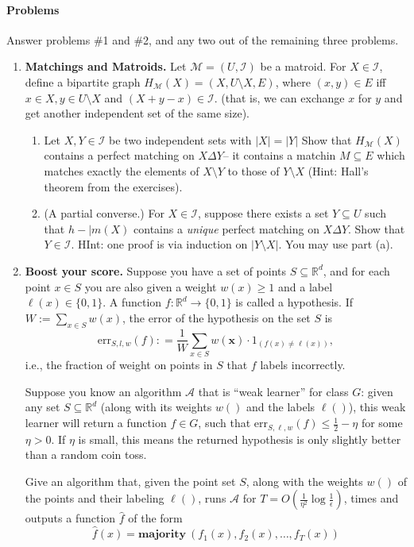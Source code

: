 \documentclass{article}
\theoremstyle{plain}
\newcommand{\I}{\mathcal{I}}
\newcommand{\R}{\mathbb{R}}
\newcommand\litem[1]{\item{\bfseries#1.\space}}
\begin{document}
\paragraph{Problems}

Answer problems \#1 and \#2, and any two out of the remaining three problems.

\renewcommand{\I}{\mathcal{I}}
\newcommand{\M}{\mathcal{M}}
\newcommand{\A}{\mathcal{A}}
\begin{enumerate}
  \litem{Matchings and Matroids} Let $\M = (U, \I)$ be a matroid. For
  $X \in \I$, define a bipartite graph
  $H_\M(X) = (X, U\setminus X, E)$, where $(x,y) \in E$ iff
  $x \in X, y \in U\setminus X$ and $(X + y - x)\in \I$. (that is, we
  can exchange $x$ for $y$ and get another independent set of the same
  size).
\begin{enumerate}
\item Let $X, Y \in \I$ be two independent sets with $|X| = |Y|$ Show
  that $H_\M(X)$ contains a perfect matching on $X \Delta Y$-- it
  contains a matchin $M \subseteq E$ which matches exactly the
  elements of $X \setminus Y$ to those of $Y \setminus X$ (Hint:
  Hall's theorem from the exercises).
\item (A partial converse.) For $X \in \I$, suppose there exists a set
  $Y\subseteq U$ such that $h-|m(X)$ contains a \emph{unique} perfect
  matching on $X \Delta Y$. Show that $Y \in \I$. HInt: one proof is
  via induction on $|Y\setminus X|$. You may use part (a).
  \end{enumerate}
%
\litem{Boost your score} Suppose you have a set of points $S \subseteq \R^d$, and for each point $x\in S$
you are also given a weight $w(x) \geq 1$ and a label $\ell(x) \in \{0, 1\}$. A function $f : \R^d \to \{0, 1\}$ is
called a hypothesis. If $W := \sum_{x \in S}w(x)$, the error of the hypothesis on the set $S$ is
\[\mathrm{err} _ { S ,l ,w } ( f ) : = \frac { 1} { W } \sum _ { x \in S } w ( \mathbf { x } ) \cdot 1_ { ( f ( x ) \neq \ell ( x ) ) },\]
i.e., the fraction of weight on points in $S$ that $f$ labels incorrectly.

Suppose you know an algorithm $\A$ that is “weak learner” for class $G$: given any set $S \subseteq \R^d$
(along with its weights $w()$ and the labels $\ell()$), this weak learner will return a function $f \in G$,
such that $\textrm{err}_{S,\ell,w}(f) \leq \frac{1}{2} -\eta$ for some $\eta > 0$. If $\eta$ is small, this means the returned hypothesis
is only slightly better than a random coin toss.

Give an algorithm that, given the point set $S$, along with the
weights $w()$ of the points and their labeling $\ell()$, runs $\A$ for
$T = O(\frac{1}{\eta^2} \log \frac{1}{\epsilon})$, times and
outputs a function $\hat{f}$ of the form
\[\hat { f } ( x ) = \mathbf{ m a j o r i t y ~ } ( f _ { 1} ( x ) ,f _ { 2} ( x ) ,\ldots ,f _ { T } ( x ) )\]


\end{enumerate}
\end{document}
